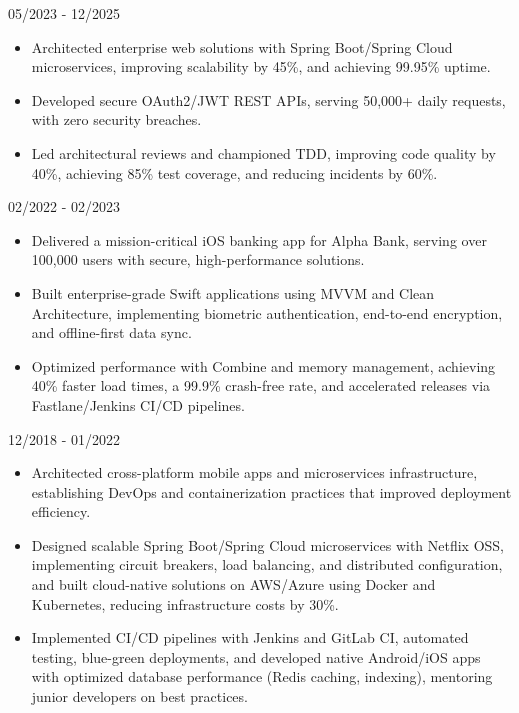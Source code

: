 \documentclass{mycv}
\begin{document}
{05/2023 - 12/2025}

\begin{itemize}
    \item Architected enterprise web solutions with Spring Boot/Spring Cloud microservices, improving scalability by 45\%, and
achieving 99.95\% uptime.
    \item Developed secure OAuth2/JWT REST APIs, serving 50,000+ daily requests, with zero security breaches.
    \item Led architectural reviews and championed TDD, improving code quality by 40\%, achieving 85\% test coverage, and
reducing incidents by 60\%.
\end{itemize}

{02/2022 - 02/2023}

\begin{itemize}
    \item Delivered a mission-critical iOS banking app for Alpha Bank, serving over 100,000 users with secure, high-performance
solutions.
    \item Built enterprise-grade Swift applications using MVVM and Clean Architecture, implementing biometric authentication,
end-to-end encryption, and offline-first data sync.
    \item Optimized performance with Combine and memory management, achieving 40\% faster load times, a 99.9\% crash-free
rate, and accelerated releases via Fastlane/Jenkins CI/CD pipelines.
\end{itemize}

\pagebreak

{12/2018 - 01/2022}

\begin{itemize}
    \item Architected cross-platform mobile apps and microservices infrastructure, establishing DevOps and containerization
practices that improved deployment efficiency.
    \item Designed scalable Spring Boot/Spring Cloud microservices with Netflix OSS, implementing circuit breakers, load
balancing, and distributed configuration, and built cloud-native solutions on AWS/Azure using Docker and Kubernetes,
reducing infrastructure costs by 30\%.
    \item Implemented CI/CD pipelines with Jenkins and GitLab CI, automated testing, blue-green deployments, and developed
native Android/iOS apps with optimized database performance (Redis caching, indexing), mentoring junior developers
on best practices.
\end{itemize}
\end{document}
